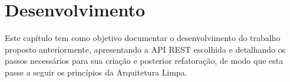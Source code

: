\chapter{Desenvolvimento}
\thispagestyle{headings}

    \par Este capítulo tem como objetivo documentar o desenvolvimento do trabalho proposto anteriormente, apresentando a API REST escolhida e detalhando os passos necessários para sua criação e posterior refatoração, de modo que esta passe a seguir os princípios da Arquitetura Limpa.

    
    
    
    
    

